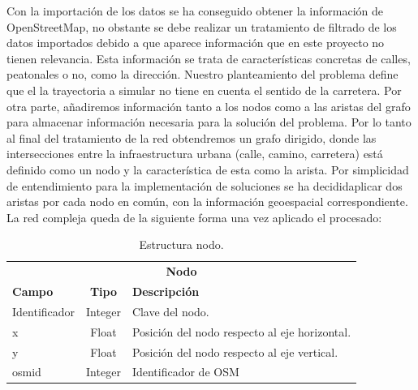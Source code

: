 Con la importación de los datos se ha conseguido obtener la información de OpenStreetMap, 
no obstante se debe realizar un tratamiento de filtrado de los datos importados debido a que aparece 
información que en este proyecto no tienen relevancia. Esta información se trata de características concretas 
de calles, peatonales o no, como la dirección. Nuestro planteamiento del problema define que el la 
trayectoria a simular no tiene en cuenta el sentido de la carretera. Por otra parte, añadiremos información 
tanto a los nodos como a las aristas del grafo para almacenar información necesaria para la solución 
del problema. Por lo tanto al final del tratamiento de la red obtendremos un grafo dirigido, donde las 
intersecciones entre la infraestructura urbana (calle, camino, carretera) está definido como un nodo y 
la característica de esta como la arista. Por simplicidad de entendimiento para la implementación de soluciones 
se ha decididaplicar dos aristas por cada nodo en común, con la información geoespacial correspondiente.
La red compleja queda de la siguiente forma una vez aplicado el procesado:
\begin{table}[h]
\centering
\begin{tabular}{l | c | l} 
\toprule
\multicolumn{3}{c}{\textbf{Nodo}} \\ 
\cmidrule(r){1-3}
{\textbf{Campo}} &  {\textbf{Tipo}} & {\textbf{Descripción}} \\
\cmidrule(r){1-3}
{Identificador}  & Integer  & Clave del nodo.\\
{x}  & Float & Posición del nodo respecto al eje horizontal. \\
{y}  & Float & Posición del nodo respecto al eje vertical.\\
{osmid} & Integer & Identificador de \ac{OSM} \\
\bottomrule
\end{tabular}
\caption{Estructura nodo.}
\label{TablaNodo}
\end{table}
